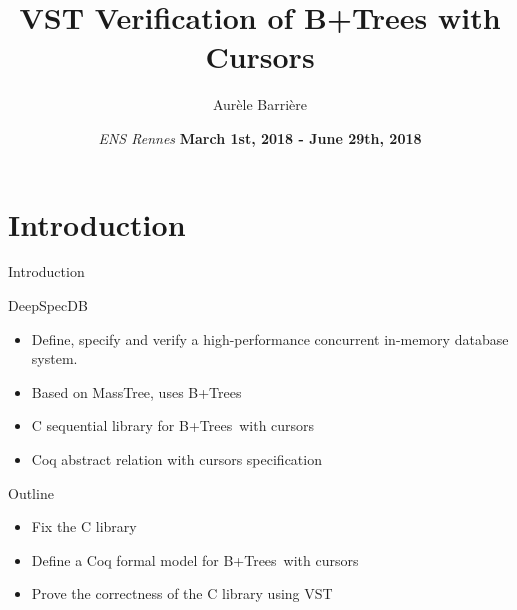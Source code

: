 \documentclass[page number,usenames,dvipsnames]{beamer}
\def\outline{
  \begin{frame}[plain,noframenumbering]
    \frametitle{Outline}
    \tableofcontents[currentsection]
  \end{frame}
}
\def\btrees{B+Trees}
\begin{document}
\title[shorttitle]{VST Verification of B+Trees with Cursors}

\author[Aur\`ele Barri\`ere]{Aur\`ele Barri\`ere}

\date{\textit{ENS Rennes}
  \vfill
  \textbf{March 1st, 2018 - June 29th, 2018}}

\def\outline{
  \begin{frame}[plain,noframenumbering]
    \frametitle{Outline}
    \tableofcontents[currentsection]
  \end{frame}
}



\begin{frame}
  \vspace{-2cm}
  \maketitle
  \vspace{-4cm}
\end{frame}



\section{Introduction}
\begin{frame}{Introduction}
  \begin{block}{DeepSpecDB}
    \begin{itemize}
    \item Define, specify and verify a high-performance concurrent in-memory database system.
    \item Based on MassTree, uses \btrees
    \item C sequential library for \btrees\ with cursors
    \item Coq abstract relation with cursors specification
    \end{itemize}
  \end{block}
  \vfill
  \begin{exampleblock}{Outline}
    \begin{itemize}
    \item Fix the C library
    \item Define a Coq formal model for \btrees\ with cursors
    \item Prove the correctness of the C library using VST
    \end{itemize}
  \end{exampleblock}
      
\end{frame}
\end{document}
